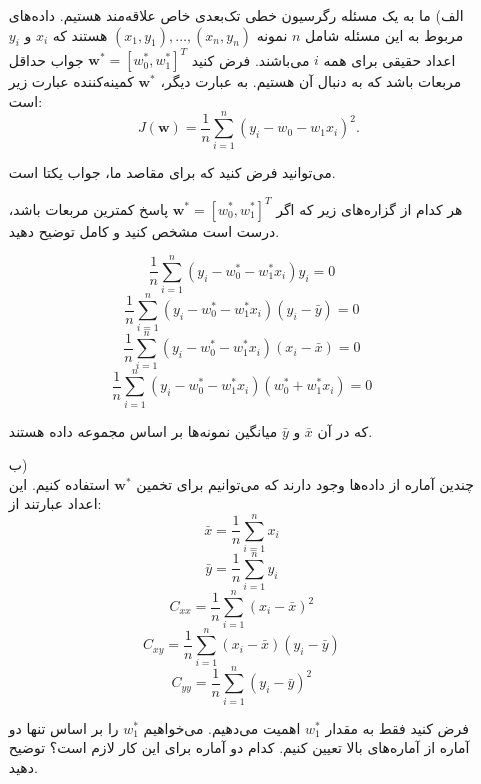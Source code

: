 
\begin{itemize}
    \item[الف)]
ما به یک مسئله رگرسیون خطی تک‌بعدی خاص علاقه‌مند هستیم. داده‌های مربوط به این مسئله شامل \(n\) نمونه \((x_1, y_1), \dots, (x_n, y_n)\) هستند که \(x_i\) و \(y_i\) اعداد حقیقی برای همه \(i\) می‌باشند. فرض کنید \( \mathbf{w}^* = [w_0^*, w_1^*]^T \) جواب حداقل مربعات باشد که به دنبال آن هستیم. به عبارت دیگر، \( \mathbf{w}^* \) کمینه‌کننده عبارت زیر است:
\[
J(\mathbf{w}) = \frac{1}{n} \sum_{i=1}^n (y_i - w_0 - w_1 x_i)^2.
\]

می‌توانید فرض کنید که برای مقاصد ما، جواب یکتا است.

هر کدام از گزاره‌های زیر که اگر 
\( \mathbf{w}^* = [w_0^*, w_1^*]^T \)
پاسخ کمترین مربعات باشد، درست است  مشخص کنید و کامل توضیح دهید.

\[
\frac{1}{n} \sum_{i=1}^n (y_i - w_0^* - w_1^* x_i)y_i = 0 \quad 
\]
\[
\frac{1}{n} \sum_{i=1}^n (y_i - w_0^* - w_1^* x_i)(y_i - \bar{y}) = 0 \quad 
\]
\[
\frac{1}{n} \sum_{i=1}^n (y_i - w_0^* - w_1^* x_i)(x_i - \bar{x}) = 0 \quad 
\]
\[
\frac{1}{n} \sum_{i=1}^n (y_i - w_0^* - w_1^* x_i)(w_0^* + w_1^* x_i) = 0 \quad 
\]

که در آن \(\bar{x}\) و \(\bar{y}\) میانگین نمونه‌ها بر اساس مجموعه داده هستند.


\item[ب)]
\\
چندین آماره از داده‌ها وجود دارند که می‌توانیم برای تخمین \( \mathbf{w}^* \) استفاده کنیم. این اعداد عبارتند از:
\[
\bar{x} = \frac{1}{n} \sum_{i=1}^n x_i \quad 
\]
\[
\bar{y} = \frac{1}{n} \sum_{i=1}^n y_i \quad 
\]
\[
C_{xx} = \frac{1}{n} \sum_{i=1}^n (x_i - \bar{x})^2 \quad 
\]
\[
C_{xy} = \frac{1}{n} \sum_{i=1}^n (x_i - \bar{x})(y_i - \bar{y}) \quad 
\]
\[
C_{yy} = \frac{1}{n} \sum_{i=1}^n (y_i - \bar{y})^2 \quad
\]

فرض کنید فقط به مقدار \(w_1^*\) اهمیت می‌دهیم. می‌خواهیم \(w_1^*\)  را بر اساس تنها دو آماره از آماره‌های بالا تعیین کنیم. کدام دو آماره برای این کار لازم است؟ توضیح دهید.
\end{itemize}